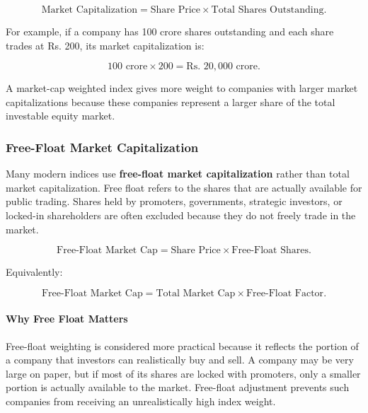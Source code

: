 \documentclass[12pt,openany]{book}
\begin{document}
\begin{equation*}
    \text{Market Capitalization} = \text{Share Price} \times \text{Total Shares Outstanding}.
\end{equation*}

For example, if a company has 100 crore shares outstanding and each share trades at Rs. 200, its market capitalization is:

\begin{equation*}
    100 \text{ crore} \times 200 = \text{Rs. }20{,}000 \text{ crore}.
\end{equation*}

A market-cap weighted index gives more weight to companies with larger market capitalizations because these companies represent a larger share of the total investable equity market.

\subsubsection{Free-Float Market Capitalization}
Many modern indices use \textbf{free-float market capitalization} rather than total market capitalization. Free float refers to the shares that are actually available for public trading. Shares held by promoters, governments, strategic investors, or locked-in shareholders are often excluded because they do not freely trade in the market.

\begin{equation*}
    \text{Free-Float Market Cap} = \text{Share Price} \times \text{Free-Float Shares}.
\end{equation*}

Equivalently:

\begin{equation*}
    \text{Free-Float Market Cap} = \text{Total Market Cap} \times \text{Free-Float Factor}.
\end{equation*}

\paragraph{Why Free Float Matters}
Free-float weighting is considered more practical because it reflects the portion of a company that investors can realistically buy and sell. A company may be very large on paper, but if most of its shares are locked with promoters, only a smaller portion is actually available to the market. Free-float adjustment prevents such companies from receiving an unrealistically high index weight.
\end{document}
